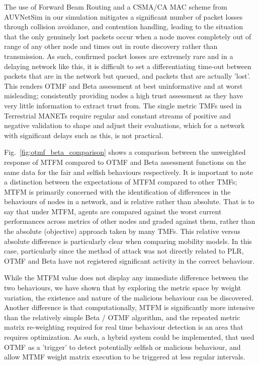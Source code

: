 \documentclass[runningheads,a4paper]{llncs}
\begin{document}
%
The use of Forward Beam Routing and a CSMA/CA MAC scheme from AUVNetSim\cite{Miquel2008} in our simulation mitigates a significant number of packet losses through collision avoidance, and contention handling, leading to the situation that the only genuinely lost packets occur when a node moves completely out of range of any other node and times out in route discovery rather than transmission.
As such, confirmed packet losses are extremely rare and in a delaying network like this, it is difficult to set a differentiating time-out between packets that are in the network but queued, and packets that are actually 'lost'.
This renders OTMF and Beta assessment at best uninformative and at worst misleading; consistently providing nodes a high trust assessment as they have very little information to extract trust from. 
The single metric TMFs used in Terrestrial MANETs require regular and constant streams of positive and negative validation to shape and adjust their evaluations, which for a network with significant delays such as this, is not practical.

Fig.~\ref{fig:otmf_beta_comparison} shows a comparison between the unweighted response of MTFM compared to OTMF and Beta assessment functions on the same data for the fair and selfish behaviours respectively.
It is important to note a distinction between the expectations of MTFM compared to other TMFs; MTFM is primarily concerned with the identification of differences in the behaviours of nodes in a network, and is relative rather than absolute.
That is to say that under MTFM, agents are compared against the worst current performances across metrics of other nodes and graded against them, rather than the absolute (objective) approach taken by many TMFs.
This relative versus absolute difference is particularly clear when comparing mobility models. 
In this case, particularly since the method of attack was not directly related to PLR, OTMF and Beta have not registered significant activity in the correct behaviour.

While the MTFM value does not display any immediate difference between the two behaviours, we have shown that by exploring the metric space by weight variation, the existence and nature of the malicious behaviour can be discovered.
Another difference is that computationally, MTFM is significantly more intensive than the relatively simple Beta / OTMF algorithm, and the repeated metric matrix re-weighting required for real time behaviour detection is an area that requires optimization. 
As such, a hybrid system could be implemented, that used OTMF as a 'trigger' to detect potentially selfish or malicious behaviour, and allow MTMF weight matrix execution to be triggered at less regular intervals.
\end{document}
